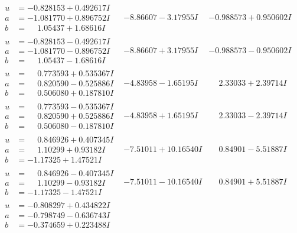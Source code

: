 \documentclass[1p]{elsarticle_modified}
\theoremstyle{definition}
\begin{document}
$$\begin{array}{c|c|c}
\begin{aligned}
u &= -0.828153 + 0.492617 I \\
a &= -1.081770 + 0.896752 I \\
b &= \phantom{-}1.05437 + 1.68616 I\end{aligned}
 & -8.86607 - 3.17955 I & -0.988573 + 0.950602 I \\ \hline\begin{aligned}
u &= -0.828153 - 0.492617 I \\
a &= -1.081770 - 0.896752 I \\
b &= \phantom{-}1.05437 - 1.68616 I\end{aligned}
 & -8.86607 + 3.17955 I & -0.988573 - 0.950602 I \\ \hline\begin{aligned}
u &= \phantom{-}0.773593 + 0.535367 I \\
a &= \phantom{-}0.820590 - 0.525886 I \\
b &= \phantom{-}0.506080 + 0.187810 I\end{aligned}
 & -4.83958 - 1.65195 I & \phantom{-}2.33033 + 2.39714 I \\ \hline\begin{aligned}
u &= \phantom{-}0.773593 - 0.535367 I \\
a &= \phantom{-}0.820590 + 0.525886 I \\
b &= \phantom{-}0.506080 - 0.187810 I\end{aligned}
 & -4.83958 + 1.65195 I & \phantom{-}2.33033 - 2.39714 I \\ \hline\begin{aligned}
u &= \phantom{-}0.846926 + 0.407345 I \\
a &= \phantom{-}1.10299 + 0.93182 I \\
b &= -1.17325 + 1.47521 I\end{aligned}
 & -7.51011 + 10.16540 I & \phantom{-}0.84901 - 5.51887 I \\ \hline\begin{aligned}
u &= \phantom{-}0.846926 - 0.407345 I \\
a &= \phantom{-}1.10299 - 0.93182 I \\
b &= -1.17325 - 1.47521 I\end{aligned}
 & -7.51011 - 10.16540 I & \phantom{-}0.84901 + 5.51887 I \\ \hline\begin{aligned}
u &= -0.808297 + 0.434822 I \\
a &= -0.798749 - 0.636743 I \\
b &= -0.374659 + 0.223488 I\end{aligned}

\end{array}$$
\end{document}
